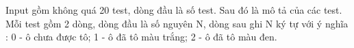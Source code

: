 Input gồm không quá 20 test, dòng đầu là số test. Sau đó là mô tả của các test.   
\\   Mỗi test gồm 2 dòng, dòng đầu là số nguyên N, dòng sau ghi N ký tự với ý nghĩa : 0 - ô chưa được tô; 1 - ô đã tô màu trắng; 2 - ô đã tô màu đen.